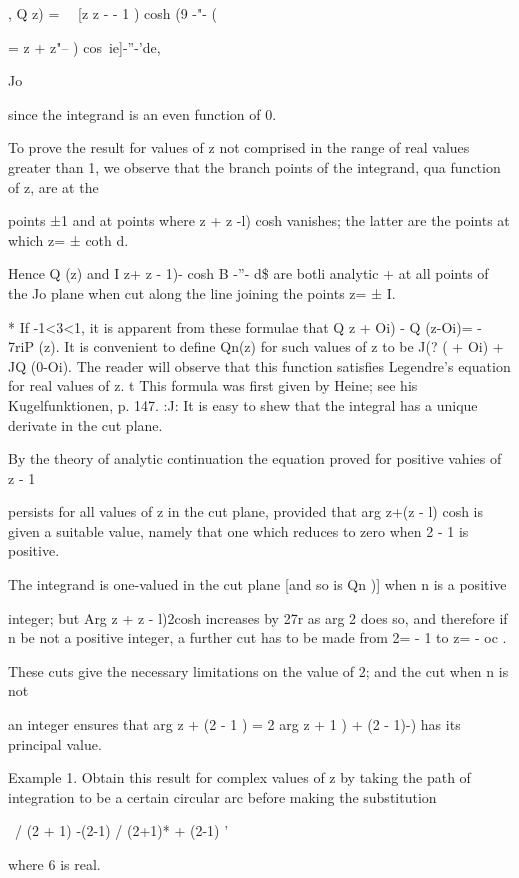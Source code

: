 {{, Q z) = \ \ [z z - - 1 ) cosh (9 -"- (

= z + z"-- ) cos\ ie]-''-'de,

Jo

since the integrand is an even function of 0.

To prove the result for values of z not comprised in the range of real
values greater than 1, we observe that the branch points of the
integrand, qua function of z, are at the

points ±1 and at points where z + z -l) cosh vanishes; the latter are
the points at which z= ± coth d.

Hence Q (z) and I z+ z - 1)- cosh B -''- d\$ are botli analytic + at
all points of the Jo plane when cut along the line joining the points
z= ± I.

* If -1<3<1, it is apparent from these formulae that Q z + Oi) - Q
(z-Oi)= - 7riP (z). It is convenient to define Qn(z) for such values
of z to be J(? ( + Oi) + JQ (0-Oi). The reader will observe that this
function satisfies Legendre's equation for real values of z. t This
formula was first given by Heine; see his Kugelfunktionen, p. 147.
:J: It is easy to shew that the integral has a unique derivate in the
cut plane.

%
%

By the theory of analytic continuation the equation proved for
positive vahies of z - 1

persists for all values of z in the cut plane, provided that arg z+(z
- l) cosh is given a suitable value, namely that one which reduces to
zero when 2 - 1 is positive.

The integrand is one-valued in the cut plane [and so is Qn )] when n
is a positive

integer; but Arg z + z - l)2cosh increases by 27r as arg 2 does so,
and therefore if n be not a positive integer, a further cut has to be
made from 2= - 1 to z= - oc .

These cuts give the necessary limitations on the value of 2; and the
cut when n is not

an integer ensures that arg z + (2 - 1 ) = 2 arg z + 1 ) + (2 - 1)-)
has its principal value.

Example 1. Obtain this result for complex values of z by taking the
path of integration to be a certain circular arc before making the
substitution

 \ / (2 + 1) -(2-1) / (2+1)* + (2-1) '

where 6 is real.

}}
